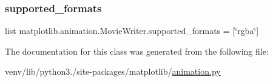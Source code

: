 \subsubsection{\texorpdfstring{supported\+\_\+formats}{supported\_formats}}
{\footnotesize\ttfamily list matplotlib.\+animation.\+Movie\+Writer.\+supported\+\_\+formats = \mbox{[}\char`\"{}rgba\char`\"{}\mbox{]}\hspace{0.3cm}{\ttfamily [static]}}



The documentation for this class was generated from the following file\+:\begin{DoxyCompactItemize}
\item 
venv/lib/python3./site-\/packages/matplotlib/\hyperlink{animation_8py}{animation.\+py}\end{DoxyCompactItemize}
